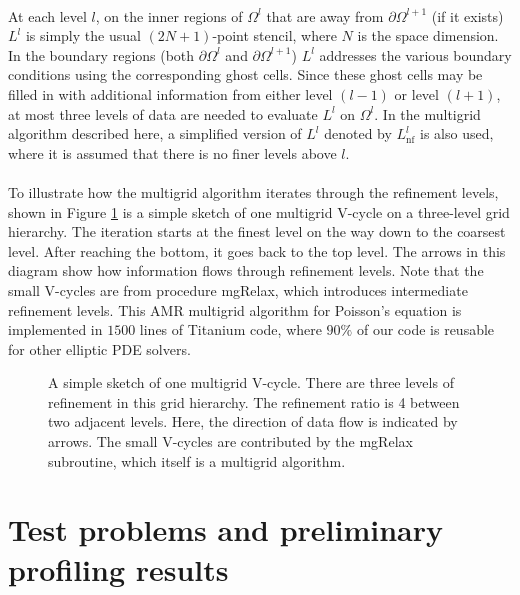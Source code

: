 \documentclass{ieee}
\numberwithin{equation}{section}
\begin{document}
\paragraph{}At each level $l$, on the inner regions of $\Omega^l$ that are away from $\partial \Omega^{l+1}$ (if it exists) $L^l$ is simply the usual $(2N+1)$-point stencil, where $N$ is the space dimension. In the boundary regions (both $\partial \Omega^{l}$ and $\partial \Omega^{l+1}$) $L^l$ addresses the various boundary conditions using the corresponding  ghost cells. Since these ghost cells may be filled in with additional information from either level $(l-1)$ or level $(l+1)$, at most three levels of data are needed to evaluate $L^l$ on $\Omega^l$. In the multigrid algorithm described here, a simplified version of $L^l$ denoted by $L^l_{\text{nf}}$ is also used, where it is assumed that there is no finer levels above $l$.   

\paragraph{}To illustrate how the multigrid algorithm iterates through the refinement levels, shown in Figure \ref{Vcycle} is a simple sketch of one multigrid V-cycle on a three-level grid hierarchy. The iteration starts at the finest level on the way down to the coarsest level. After reaching the bottom, it goes back to the top level. The arrows in this diagram show how information flows through refinement levels. Note that  the small V-cycles are from procedure mgRelax, which introduces intermediate refinement levels. This  AMR multigrid algorithm for Poisson's equation is implemented in $1500$ lines of Titanium code, where $90\%$ of our code is reusable for other elliptic PDE solvers.

\begin{figure}[h]
	\begin{center}
	\caption{A simple sketch of one multigrid V-cycle. There are three levels of refinement in this grid hierarchy. The refinement ratio is 4 between two adjacent levels. Here, the direction of data flow is indicated by  arrows. The small V-cycles are contributed by the mgRelax subroutine, which itself is a multigrid algorithm.} \label{Vcycle}
	\end{center}
\end{figure}

\section{Test problems and preliminary profiling results}
\end{document}

